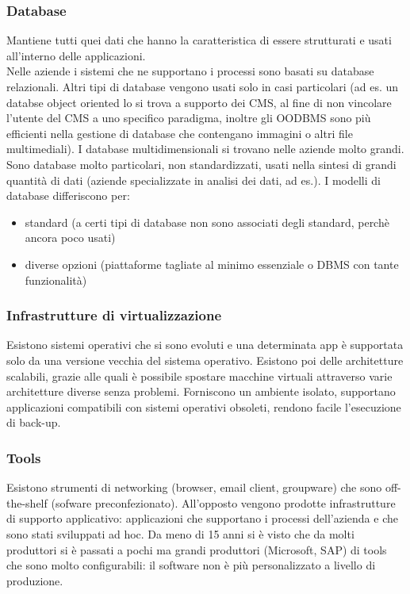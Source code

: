 \subsubsection{Database}
Mantiene tutti quei dati che hanno la caratteristica di essere strutturati e usati all'interno delle applicazioni.\\
Nelle aziende i sistemi che ne supportano i processi sono basati su database relazionali.
Altri tipi di database vengono usati solo in casi particolari (ad es. un databse object oriented lo si trova a supporto dei CMS, al fine di non vincolare l'utente del CMS a uno specifico paradigma, inoltre gli OODBMS sono pi\`u efficienti nella gestione di database che contengano immagini o altri file multimediali).
I database multidimensionali si trovano nelle aziende molto grandi. Sono database molto particolari, non standardizzati, usati nella sintesi di grandi quantit\`a di dati (aziende specializzate in analisi dei dati, ad es.).
I modelli di database differiscono per:
\begin{itemize}
  \item standard (a certi tipi di  database non sono associati degli standard, perch\`e ancora poco usati)
  \item diverse opzioni (piattaforme tagliate al minimo essenziale o DBMS con tante funzionalit\`a)
\end{itemize}
\subsubsection{Infrastrutture di virtualizzazione}
Esistono sistemi operativi che si sono evoluti e una determinata app \`e supportata solo da una versione vecchia del sistema operativo.
Esistono poi delle architetture scalabili, grazie alle quali \`e possibile spostare macchine virtuali attraverso varie architetture diverse senza problemi.
Forniscono un ambiente isolato, supportano applicazioni compatibili con sistemi operativi obsoleti, rendono facile l'esecuzione di back-up.



\subsubsection{Tools}
\label{subs:Tools}
Esistono strumenti di networking (browser, email client, groupware) che sono off-the-shelf (sofware preconfezionato).
All'opposto vengono prodotte infrastrutture di supporto applicativo: applicazioni che supportano i processi dell'azienda e che sono stati sviluppati ad hoc.
Da meno di 15 anni si \`e visto che da molti produttori si \`e passati a pochi ma grandi produttori
(Microsoft, SAP) di tools che sono molto configurabili: il software non \`e pi\`u personalizzato
a livello di produzione.

